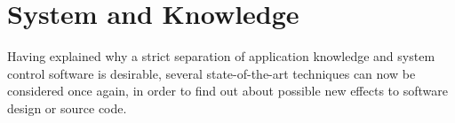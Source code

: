%
%
%
%
%
%
%

\section{System and Knowledge}
\label{system_and_knowledge_heading}

Having explained why a strict separation of application knowledge and system
control software is desirable, several state-of-the-art techniques can now be
considered once again, in order to find out about possible new effects to
software design or source code.








%


